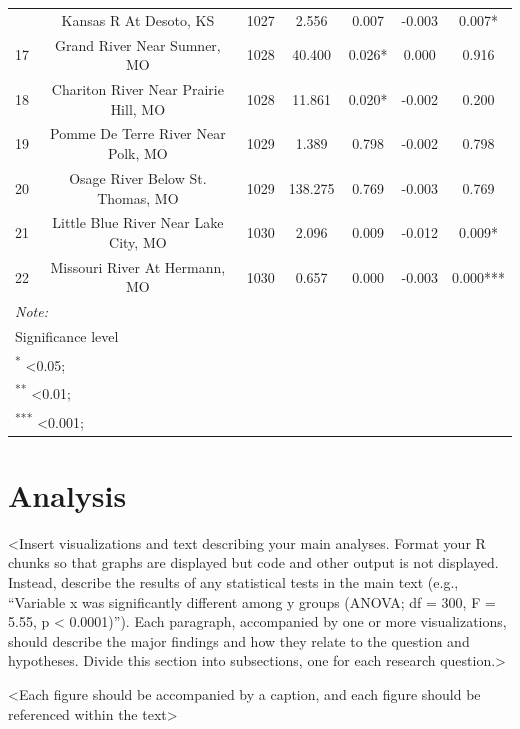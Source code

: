 \documentclass[12pt,]{article}
\begin{document}
\begin{table}[!h]
{\begin{tabular}{rcccccc}
\addlinespace
16 & Kansas R At Desoto, KS & 1027 & 2.556 & 0.007 & -0.003 & 0.007*\\
\rowcolor{gray!6}  17 & Grand River Near Sumner, MO & 1028 & 40.400 & 0.026* & 0.000 & 0.916\\
18 & Chariton River Near Prairie Hill, MO & 1028 & 11.861 & 0.020* & -0.002 & 0.200\\
\rowcolor{gray!6}  19 & Pomme De Terre River Near Polk, MO & 1029 & 1.389 & 0.798 & -0.002 & 0.798\\
20 & Osage River Below St. Thomas, MO & 1029 & 138.275 & 0.769 & -0.003 & 0.769\\
\addlinespace
\rowcolor{gray!6}  21 & Little Blue River Near Lake City, MO & 1030 & 2.096 & 0.009 & -0.012 & 0.009*\\
22 & Missouri River At Hermann, MO & 1030 & 0.657 & 0.000 & -0.003 & 0.000***\\
\bottomrule
\multicolumn{7}{l}{\textit{Note: }}\\
\multicolumn{7}{l}{Significance level}\\
\multicolumn{7}{l}{\textsuperscript{*} <0.05;}\\
\multicolumn{7}{l}{\textsuperscript{**} <0.01;}\\
\multicolumn{7}{l}{\textsuperscript{***} <0.001;}\\
\end{tabular}}
\end{table}

\newpage

\hypertarget{analysis}{%
\section{Analysis}\label{analysis}}

\textless{}Insert visualizations and text describing your main analyses.
Format your R chunks so that graphs are displayed but code and other
output is not displayed. Instead, describe the results of any
statistical tests in the main text (e.g., ``Variable x was significantly
different among y groups (ANOVA; df = 300, F = 5.55, p \textless{}
0.0001)''). Each paragraph, accompanied by one or more visualizations,
should describe the major findings and how they relate to the question
and hypotheses. Divide this section into subsections, one for each
research question.\textgreater{}

\textless{}Each figure should be accompanied by a caption, and each
figure should be referenced within the text\textgreater{}
\end{document}

